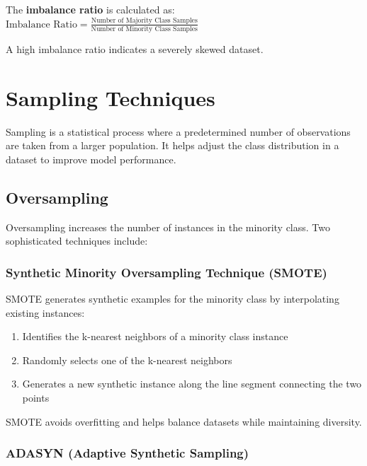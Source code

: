 \documentclass[
  letterpaper,
  DIV=11,
  numbers=noendperiod]{scrreprt}
\providecommand{\tightlist}{%
  \setlength{\itemsep}{0pt}\setlength{\parskip}{0pt}}\usepackage{longtable,booktabs,array}
\begin{document}
The \textbf{imbalance ratio} is calculated as:
\(\text{Imbalance Ratio} = \frac{\text{Number of Majority Class Samples}}{\text{Number of Minority Class Samples}}\)

A high imbalance ratio indicates a severely skewed dataset.

\section{Sampling Techniques}\label{sampling-techniques}

Sampling is a statistical process where a predetermined number of
observations are taken from a larger population. It helps adjust the
class distribution in a dataset to improve model performance.

\subsection{Oversampling}\label{oversampling}

Oversampling increases the number of instances in the minority class.
Two sophisticated techniques include:

\subsubsection{Synthetic Minority Oversampling Technique
(SMOTE)}\label{synthetic-minority-oversampling-technique-smote}

SMOTE generates synthetic examples for the minority class by
interpolating existing instances:

\begin{enumerate}
\def\labelenumi{\arabic{enumi}.}
\tightlist
\item
  Identifies the k-nearest neighbors of a minority class instance
\item
  Randomly selects one of the k-nearest neighbors
\item
  Generates a new synthetic instance along the line segment connecting
  the two points
\end{enumerate}

SMOTE avoids overfitting and helps balance datasets while maintaining
diversity.

\subsubsection{ADASYN (Adaptive Synthetic
Sampling)}\label{adasyn-adaptive-synthetic-sampling}
\end{document}
